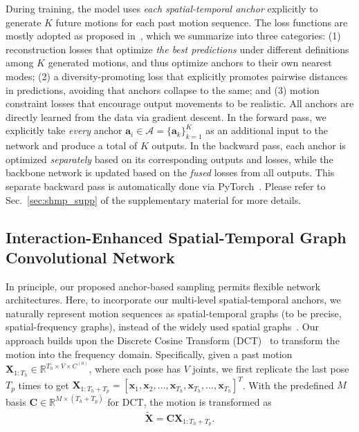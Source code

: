 During training, the model uses \textit{each spatial-temporal anchor} explicitly to generate $K$ future motions for each past motion sequence. The loss functions are mostly adopted as proposed in~\cite{mao2021generating}, which we summarize into three categories: (1) reconstruction losses that optimize \textit{the best predictions} under different definitions among $K$ generated motions, and thus optimize anchors to their own nearest modes; (2) a diversity-promoting loss that explicitly promotes pairwise distances in predictions, avoiding that anchors collapse to the same; and (3) motion constraint losses that encourage output movements to be realistic. All anchors are directly learned from the data via gradient descent.
In the forward pass, we explicitly take {\em every} anchor $\mathbf{a}_i \in \mathcal{A}=\{\mathbf{a}_k\}_{k=1}^K$ as an additional input to the network and produce a total of $K$ outputs. In the backward pass, each anchor is optimized \textit{separately} based on its corresponding outputs and losses, while the backbone network is updated based on the \textit{fused} losses from all outputs. This separate backward pass is automatically done via PyTorch~\cite{paszke2019pytorch}. Please refer to Sec.~\ref{sec:shmp_supp} of the supplementary material for more details.

\subsection{Interaction-Enhanced Spatial-Temporal Graph Convolutional Network}\label{sec:network}
In principle, our proposed anchor-based sampling permits flexible network architectures. Here, to incorporate our multi-level spatial-temporal anchors, we naturally represent motion sequences as spatial-temporal graphs (to be precise,  spatial-frequency graphs), instead of the widely used spatial graphs~\cite{wei2019motion,mao2021generating}.  Our approach builds upon the Discrete Cosine Transform (DCT)~\cite{wei2019motion,mao2021generating} to transform the motion into the frequency domain. Specifically, given a past motion $\mathbf X_{1:T_h} \in \mathbb{R}^{T_h \times V \times C^{(0)}}$, where each pose has $V$ joints, we first replicate the last pose $T_p$ times to get $\mathbf {X}_{1:T_h+T_p} = [\mathbf x_1, \mathbf x_2,\ldots,\mathbf x_{T_h}, \mathbf x_{T_h}, \ldots,\mathbf x_{T_h}]^T$. With the predefined $M$ basis $\mathbf{C} \in \mathbb{R}^{ M\times (T_h+T_p)}$ for DCT, the motion is transformed as
\begin{align}
    \widetilde{\mathbf {X}} = \mathbf{C}\mathbf {X}_{1:T_h+T_p}.
\end{align}

